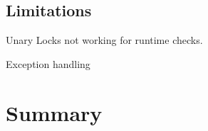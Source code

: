 






\subsection{Limitations}

Unary Locks not working for runtime checks.

Exception handling

 
 

\section{Summary}
